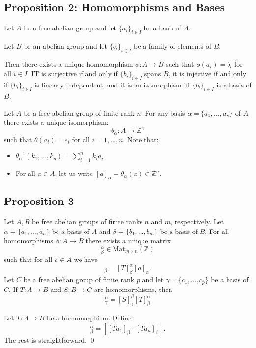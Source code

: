\documentclass{article}
\renewenvironment{proof}{{\bfseries\color{blue1} Proof:}}{\qed}
\begin{document}
\subsection{Proposition 2: Homomorphisms and Bases}
\begin{idea}
    Let $A$ be a free abelian group and let $\{a_i\}_{i\in I}$ be a basis of $A$.

    Let $B$ be an abelian group and let $\{b_i\}_{i\in I}$ be a family of elements of $B$.

    Then there exists a unique homomorphism $\phi:A\rightarrow B$ such that $\phi(a_i)=b_i$ for all $i\in I$. IT is surjective if and only if $\{b_i\}_{i\in I}$ spans $B$, it is injective if and only if $\{b_i\}_{i\in I}$ is linearly independent, and it is an isomorphism iff $\{b_i\}_{i\in I}$ is a basis of $B$.
\end{idea}
Let $A$ be a free abelian group of finite rank $n$. For any basis $\alpha=\{a_1,\dots,a_n\}$ of $A$ there exists a unique isomorphism:
\begin{equation}
    \theta_\alpha: A \rightarrow \mathbb{Z}^n
\end{equation}
such that $\theta(a_i)=e_i$ for all $i=1,\dots,n$. Note that:
\begin{itemize}
    \item $\theta_\alpha^{-1}(k_1,\dots,k_n)=\sum_{i=1}^n k_ia_i$
    \item For all $a\in A$, let us write $[a]_\alpha = \theta_\alpha(a) \in \mathbb{Z}^n$.
\end{itemize}
\subsection{Proposition 3}
\begin{idea}
    Let $A,B$ be free abelian groups of finite ranks $n$ and $m$, respectively. Let $\alpha=\{a_1,\dots,a_n\}$ be a basis of $A$ and $\beta=\{b_1,\dots,b_m\}$ be a basis of $B$. For all homomorphisms $\phi: A\rightarrow B$ there exists a unique matrix
    \begin{equation}
        [T]^\alpha_\beta \in \text{Mat}_{m\times n}(\mathbb{Z})
    \end{equation}
    such that for all $a\in A$ we have
    \begin{equation}
        [Ta]_\beta = [T]^\alpha_\beta [a]_\alpha.
    \end{equation}
    Let $C$ be a free abelian group of finite rank $p$ and let $\gamma = \{c_1,\dots,c_p\}$ be a basis of $C$. If $T: A\rightarrow B$ and $S: B\rightarrow C$ are homomorphisms, then
    \begin{equation}
        [S \circ T]^\alpha_\gamma = [S]^\beta_\gamma [T]^\alpha_\beta
    \end{equation}
\end{idea}
\begin{proof}
    Let $T:A\rightarrow B$ be a homomorphism. Define
    \begin{equation}
        [T]^\alpha_\beta = [[Ta_1]_\beta \cdots [Ta_n]_\beta].
    \end{equation}
    The rest is straightforward.
\end{proof}
\end{document}
